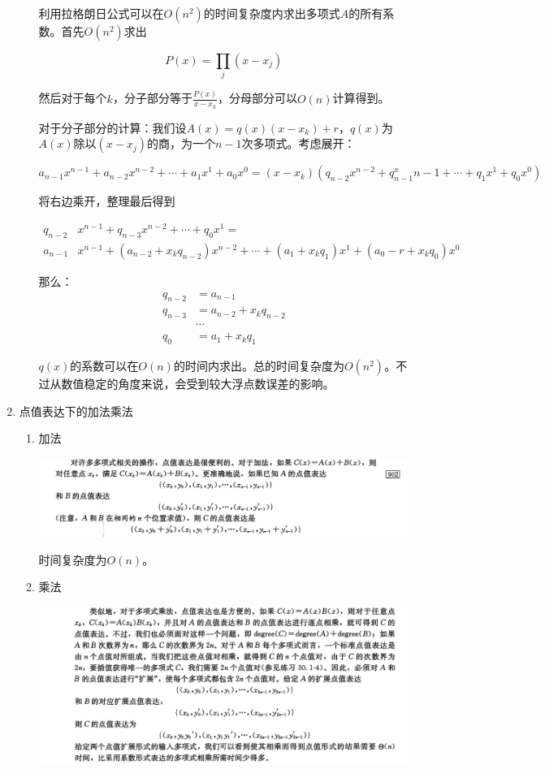 \documentclass[11pt]{article}
\begin{document}
\begin{enumerate}
\begin{enumerate}
利用拉格朗日公式可以在\(O(n^2)\)的时间复杂度内求出多项式\(A\)的所有系数。首先\(O(n^2)\)求出

$$
P(x)=\prod_j (x-x_j)
$$

然后对于每个\(k\)，分子部分等于\(\frac{P(x)}{x-x_k}\)，分母部分可以\(O(n)\)计算得到。

对于分子部分的计算：我们设\(A(x)=q(x)(x-x_k)+r\)，\(q(x)\)为\(A(x)\)除以\((x-x_j)\)的商，为一个\(n-1\)次多项式。考虑展开：

$$
a_{n-1}x^{n-1}+a_{n-2}x^{n-2}+ \cdots +a_1x^1+a_0x^0=(x-x_k)(q_{n-2}x^{n-2}+q_{n-1}^x{n-1}+ \cdots +q_1x^1+q_0x^0)
$$

将右边乘开，整理最后得到

$$
\begin{aligned}
q_{n-2}&x^{n-1}+q_{n-3}x^{n-2}+\cdots+q_0x^1=\\
a_{n-1}&x^{n-1}+(a_{n-2}+x_kq_{n-2})x^{n-2}+\cdots+(a_1+x_kq_1)x^1+(a_0-r+x_kq_0)x^0
\end{aligned}
$$

那么：
$$
\begin{aligned}
q_{n-2}&=a_{n-1}\\
q_{n-3}&=a_{n-2}+x_kq_{n-2}\\
&\cdots\\
q_0&=a_1+x_kq_1
\end{aligned}
$$

\(q(x)\)的系数可以在\(O(n)\)的时间内求出。总的时间复杂度为\(O(n^2)\)。不过从数值稳定的角度来说，会受到较大浮点数误差的影响。
\end{enumerate}
\item 点值表达下的加法乘法
\label{sec-1-3-2-3}
\begin{enumerate}
\item 加法
\label{sec-1-3-2-3-1}

\includegraphics[width=.9\linewidth]{./Source/Polynomial/10.png}

时间复杂度为\(O(n)\)。

\item 乘法
\label{sec-1-3-2-3-2}

\includegraphics[width=.9\linewidth]{./Source/Polynomial/11.png}
\end{enumerate}
\end{enumerate}
\end{document}
